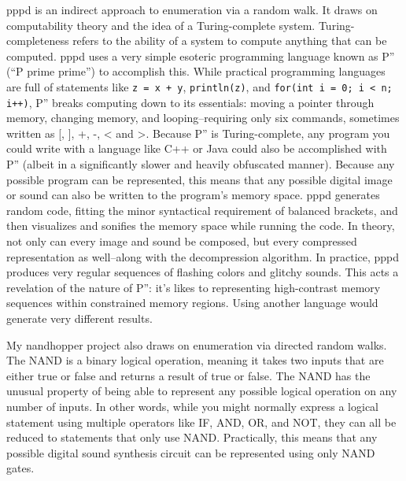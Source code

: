 \documentclass{thesis}
\begin{document}
	pppd\cite{kyle_mcdonald_pppd_2009} is an indirect approach to enumeration via a random walk. It draws on computability theory\cite{boolos_computability_2002} and the idea of a Turing-complete system. Turing-completeness refers to the ability of a system to compute anything that can be computed. pppd uses a very simple esoteric programming language known as P'' (``P prime prime'') to accomplish this. While practical programming languages are full of statements like \verb!z = x + y!, \verb!println(z)!, and \verb!for(int i = 0; i < n; i++)!, P'' breaks computing down to its essentials: moving a pointer through memory, changing memory, and looping--requiring only six commands, sometimes written as [, ], +, -, < and >. Because P'' is Turing-complete, any program you could write with a language like C++ or Java could also be accomplished with P'' (albeit in a significantly slower and heavily obfuscated manner). Because any possible program can be represented, this means that any possible digital image or sound can also be written to the program's memory space. pppd generates random code, fitting the minor syntactical requirement of balanced brackets, and then visualizes and sonifies the memory space while running the code. In theory, not only can every image and sound be composed, but every compressed representation as well--along with the decompression algorithm. In practice, pppd produces very regular sequences of flashing colors and glitchy sounds. This acts a revelation of the nature of P'': it's likes to representing high-contrast memory sequences within constrained memory regions. Using another language would generate very different results.
	
	My nandhopper project\cite{kyle_mcdonald_nandhopper_2008} also draws on enumeration via directed random walks. The NAND is a binary logical operation, meaning it takes two inputs that are either true or false and returns a result of true or false. The NAND has the unusual property of being able to represent any possible logical operation on any number of inputs. In other words, while you might normally express a logical statement using multiple operators like IF, AND, OR, and NOT, they can all be reduced to statements that only use NAND. Practically, this means that any possible digital sound synthesis circuit can be represented using only NAND gates.
	
\end{document}
